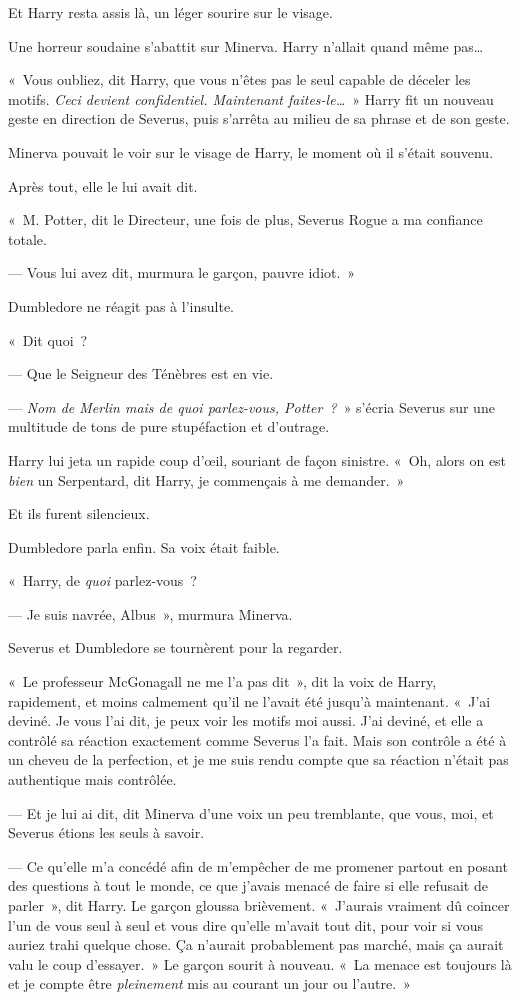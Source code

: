 Et Harry resta assis là, un léger sourire sur le visage.

Une horreur soudaine s'abattit sur Minerva. Harry n'allait quand même pas…

«~Vous oubliez, dit Harry, que vous n'êtes pas le seul capable de déceler les motifs. \emph{Ceci devient confidentiel. Maintenant faites-le…}~» Harry fit un nouveau geste en direction de Severus, puis s'arrêta au milieu de sa phrase et de son geste.

Minerva pouvait le voir sur le visage de Harry, le moment où il s'était souvenu.

Après tout, elle le lui avait dit.

«~M. Potter, dit le Directeur, une fois de plus, Severus Rogue a ma confiance totale.

--- Vous lui avez dit, murmura le garçon, pauvre idiot.~»

Dumbledore ne réagit pas à l'insulte.

«~Dit quoi~?

--- Que le Seigneur des Ténèbres est en vie.

--- \emph{Nom de Merlin mais de quoi parlez-vous, Potter~?}~» s'écria Severus sur une multitude de tons de pure stupéfaction et d'outrage.

Harry lui jeta un rapide coup d'œil, souriant de façon sinistre. «~Oh, alors on est \emph{bien} un Serpentard, dit Harry, je commençais à me demander.~»

Et ils furent silencieux.

Dumbledore parla enfin. Sa voix était faible.

«~Harry, de \emph{quoi} parlez-vous~?

--- Je suis navrée, Albus~», murmura Minerva.

Severus et Dumbledore se tournèrent pour la regarder.

«~Le professeur McGonagall ne me l'a pas dit~», dit la voix de Harry, rapidement, et moins calmement qu'il ne l'avait été jusqu'à maintenant. «~J'ai deviné. Je vous l'ai dit, je peux voir les motifs moi aussi. J'ai deviné, et elle a contrôlé sa réaction exactement comme Severus l'a fait. Mais son contrôle a été à un cheveu de la perfection, et je me suis rendu compte que sa réaction n'était pas authentique mais contrôlée.

--- Et je lui ai dit, dit Minerva d'une voix un peu tremblante, que vous, moi, et Severus étions les seuls à savoir.

--- Ce qu'elle m'a concédé afin de m'empêcher de me promener partout en posant des questions à tout le monde, ce que j'avais menacé de faire si elle refusait de parler~», dit Harry. Le garçon gloussa brièvement. «~J'aurais vraiment dû coincer l'un de vous seul à seul et vous dire qu'elle m'avait tout dit, pour voir si vous auriez trahi quelque chose. Ça n'aurait probablement pas marché, mais ça aurait valu le coup d'essayer.~» Le garçon sourit à nouveau. «~La menace est toujours là et je compte être \emph{pleinement} mis au courant un jour ou l'autre.~»

